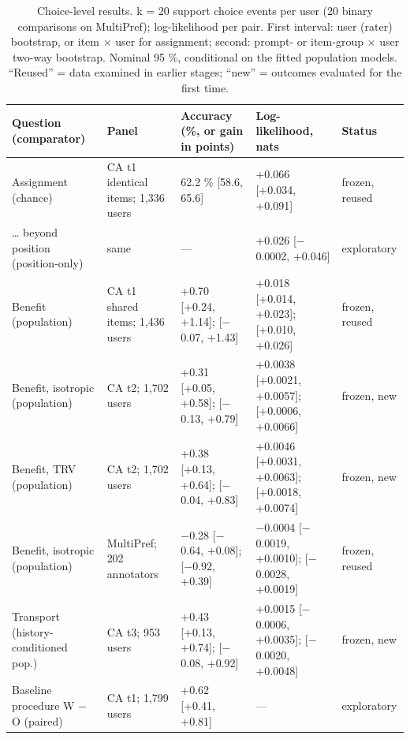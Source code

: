 \documentclass{article}
\begin{document}
\begin{table}[t]\centering\caption{Choice-level results. k = 20 support choice events per user (20 binary comparisons on MultiPref); log-likelihood per pair. First interval: user (rater) bootstrap, or item $\times$ user for assignment; second: prompt- or item-group $\times$ user two-way bootstrap. Nominal 95 \%, conditional on the fitted population models. ``Reused'' = data examined in earlier stages; ``new'' = outcomes evaluated for the first time.}\scriptsize\setlength{\tabcolsep}{3pt}\begin{tabular}{@{}
  l
  l
  l
  l
  l@{}}
\toprule\noalign{}
Question (comparator) & Panel & Accuracy (\%, or gain in points) & Log-likelihood, nats & Status \\
\midrule\noalign{}



Assignment (chance) & CA t1 identical items; 1,336 users & 62.2 \% {[}58.6, 65.6{]} & +0.066 {[}+0.034, +0.091{]} & frozen, reused \\
\ldots{} beyond position (position-only) & same & --- & +0.026 {[}$-$0.0002, +0.046{]} & exploratory \\
Benefit (population) & CA t1 shared items; 1,436 users & +0.70 {[}+0.24, +1.14{]}; {[}$-$0.07, +1.43{]} & +0.018 {[}+0.014, +0.023{]}; {[}+0.010, +0.026{]} & frozen, reused \\
Benefit, isotropic (population) & CA t2; 1,702 users & +0.31 {[}+0.05, +0.58{]}; {[}$-$0.13, +0.79{]} & +0.0038 {[}+0.0021, +0.0057{]}; {[}+0.0006, +0.0066{]} & frozen, new \\
Benefit, TRV (population) & CA t2; 1,702 users & +0.38 {[}+0.13, +0.64{]}; {[}$-$0.04, +0.83{]} & +0.0046 {[}+0.0031, +0.0063{]}; {[}+0.0018, +0.0074{]} & frozen, new \\
Benefit, isotropic (population) & MultiPref; 202 annotators & $-$0.28 {[}$-$0.64, +0.08{]}; {[}$-$0.92, +0.39{]} & $-$0.0004 {[}$-$0.0019, +0.0010{]}; {[}$-$0.0028, +0.0019{]} & frozen, reused \\
Transport (history-conditioned pop.) & CA t3; 953 users & +0.43 {[}+0.13, +0.74{]}; {[}$-$0.08, +0.92{]} & +0.0015 {[}$-$0.0006, +0.0035{]}; {[}$-$0.0020, +0.0048{]} & frozen, new \\
Baseline procedure W $-$ O (paired) & CA t1; 1,799 users & +0.62 {[}+0.41, +0.81{]} & --- & exploratory \\
\bottomrule
\end{tabular}\end{table}
\end{document}
